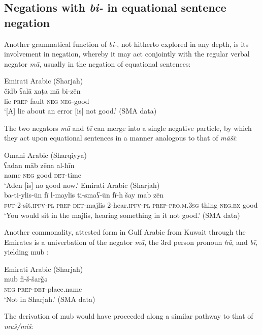 \documentclass[output=paper]{langsci/langscibook}
\begin{document}
\subsection{Negations with \textit{bi-} in equational sentence negation} \label{s:WiAR-4.2}

Another grammatical function of \textit{bi-}, not hitherto explored in any depth, is its involvement in negation, whereby it may act conjointly with the regular verbal negator \textit{mā}, usually in the negation of equational sentences:

\ea Emirati Arabic (Sharjah)\label{ex:WiAR-27}\\
	\gll čidb ʕalā xaṭa mā bi-zēn\\
	lie \textsc{prep} fault \textsc{neg} \textsc{neg}-good\\
	\glt ‘[A] lie about an error [is] not good.’ (SMA data)
\z

The two negators \textit{mā} and \textit{bī} can merge into a single negative particle, by which they act upon equational sentences in a manner analogous to that of \textit{māšī}:

\ea \label{ex:WiAR-28}
  \ea Omani Arabic (Sharqiyya)\\
  	\gll ʕadan māb zēna al-ħīn\\
	name \textsc{neg} good \textsc{det}-time\\
  	\glt ‘Aden [is] no good now.’ \citep[485]{holes2008a}
  \ex Emirati Arabic (Sharjah)\\
  	\gll ba-ti-ylis-ūn fī l-maylis ti-smaʕ-ūn fī-h šay mab zēn\\
  	\textsc{fut}-2-sit.\textsc{ipfv-pl} \textsc{prep} \textsc{det}-majlis 2-hear.\textsc{ipfv-pl} \textsc{prep-pro.m.3sg} thing \textsc{neg.ex} good\\
  	\glt ‘You would sit in the majlis, hearing something in it not good.’ (SMA data)
\z \z

Another commonality, attested form in Gulf Arabic from Kuwait through the Emirates is a univerbation of the negator \textit{mā}, the 3rd person pronoun \textit{hū}, and \textit{bī}, yielding mub \citep[64, 73, 116, 243]{holes1990a}:

\ea Emirati Arabic (Sharjah)\label{ex:WiAR-29}\\
	\gll mub fi-š-šarǧǝ\\
	\textsc{neg} \textsc{prep-det}-place.name\\
	\glt ‘Not in Sharjah.’ (SMA data)
\z

The derivation of mub would have proceeded along a similar pathway to that of \textit{muš/miš}:
\end{document}
